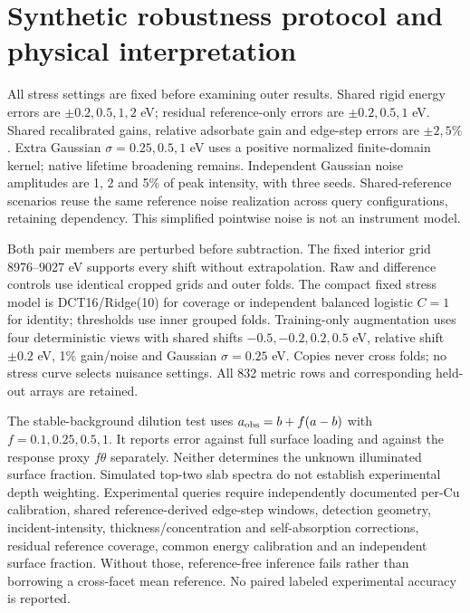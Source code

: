 \documentclass[11pt,a4paper]{article}
\begin{document}
\section{Synthetic robustness protocol and physical interpretation}
All stress settings are fixed before examining outer results. Shared rigid energy errors are $\pm0.2,0.5,1,2$ eV; residual reference-only errors are $\pm0.2,0.5,1$ eV. Shared recalibrated gains, relative adsorbate gain and edge-step errors are $\pm2,5\%$. Extra Gaussian $\sigma=0.25,0.5,1$ eV uses a positive normalized finite-domain kernel; native lifetime broadening remains. Independent Gaussian noise amplitudes are 1, 2 and 5\% of peak intensity, with three seeds. Shared-reference scenarios reuse the same reference noise realization across query configurations, retaining dependency. This simplified pointwise noise is not an instrument model.

Both pair members are perturbed before subtraction. The fixed interior grid 8976--9027 eV supports every shift without extrapolation. Raw and difference controls use identical cropped grids and outer folds. The compact fixed stress model is DCT16/Ridge(10) for coverage or independent balanced logistic $C=1$ for identity; thresholds use inner grouped folds. Training-only augmentation uses four deterministic views with shared shifts $-0.5,-0.2,0.2,0.5$ eV, relative shift $\pm0.2$ eV, 1\% gain/noise and Gaussian $\sigma=0.25$ eV. Copies never cross folds; no stress curve selects nuisance settings. All 832 metric rows and corresponding held-out arrays are retained.

The stable-background dilution test uses $a_{\rm obs}=b+f(a-b)$ with $f=0.1,0.25,0.5,1$. It reports error against full surface loading and against the response proxy $f\theta$ separately. Neither determines the unknown illuminated surface fraction. Simulated top-two slab spectra do not establish experimental depth weighting. Experimental queries require independently documented per-Cu calibration, shared reference-derived edge-step windows, detection geometry, incident-intensity, thickness/concentration and self-absorption corrections, residual reference coverage, common energy calibration and an independent surface fraction. Without those, reference-free inference fails rather than borrowing a cross-facet mean reference. No paired labeled experimental accuracy is reported.\cite{ramaker2010,ramaker2014}
\end{document}
